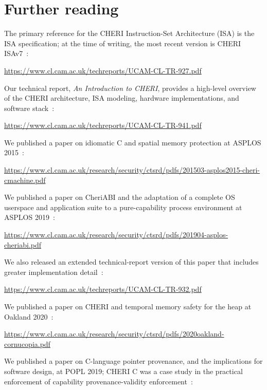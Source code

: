 \documentclass[12pt,twoside,openright,a4paper]{article}
\begin{document}
\section{Further reading}
\label{sec:further_reading}

The primary reference for the CHERI Instruction-Set Architecture (ISA) is the
ISA specification; at the time of writing, the most recent version is CHERI
ISAv7~\cite{UCAM-CL-TR-927}:

\smallskip
\noindent
\url{https://www.cl.cam.ac.uk/techreports/UCAM-CL-TR-927.pdf}
\smallskip

\noindent
Our technical report, \textit{An Introduction to CHERI}, provides a high-level
overview of the CHERI architecture, ISA modeling, hardware implementations,
and software stack~\cite{UCAM-CL-TR-941}:

\smallskip
\noindent
\url{https://www.cl.cam.ac.uk/techreports/UCAM-CL-TR-941.pdf}
\smallskip

\noindent
We published a paper on idiomatic C and spatial memory protection at ASPLOS
2015~\cite{ChisnallCPDP11}:

\smallskip
\noindent
\url{https://www.cl.cam.ac.uk/research/security/ctsrd/pdfs/201503-asplos2015-cheri-cmachine.pdf}
\smallskip

\noindent
We published a paper on CheriABI and the adaptation of a complete OS userspace
and application suite to a pure-capability process environment at ASPLOS
2019~\cite{davis2019:cheriabi}:

\smallskip
\noindent
\url{https://www.cl.cam.ac.uk/research/security/ctsrd/pdfs/201904-asplos-cheriabi.pdf}
\smallskip

\noindent
We also released an extended technical-report version of this paper that
includes greater implementation detail~\cite{UCAM-CL-TR-932}:

\smallskip
\noindent
\url{https://www.cl.cam.ac.uk/techreports/UCAM-CL-TR-932.pdf}
\smallskip

\noindent
We published a paper on CHERI and temporal memory safety for the heap at
Oakland 2020~\cite{filardo:cornucopia}:

\smallskip
\noindent
\url{https://www.cl.cam.ac.uk/research/security/ctsrd/pdfs/2020oakland-cornucopia.pdf}
\smallskip

\noindent
We published a paper on C-language pointer provenance, and the implications
for software design, at POPL 2019; CHERI C was a case study in the practical
enforcement of capability provenance-validity
enforcement~\cite{cerberus-popl2019}:
\end{document}
